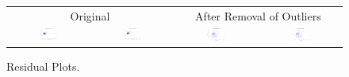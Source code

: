 \documentclass[11pt]{scrartcl} %
\begin{document}
\begin{figure}[H] %
	\centering
	\begin{tabular}{p{} p{}p{}p{}}
	\hline
	\multicolumn{2}{|c|}{Original} &  \multicolumn{2}{|c|}{After Removal of Outliers} \\
		\multicolumn{1}{|c}{\includegraphics[width=0.23\textwidth]{../graphics/A1Residuals1}} &
		\multicolumn{1}{c|}{\includegraphics[width=0.23\textwidth]{../graphics/A1StudentResiduals1}} &
		\multicolumn{1}{|c}{\includegraphics[width=0.23\textwidth]{../graphics/A1Residuals2}} &
		\multicolumn{1}{c|}{\includegraphics[width=0.23\textwidth]{../graphics/A1StudentResiduals2}}\\
		\hline
	\end{tabular}		
	\caption{Residual Plots.} %
	\label{fig:A1RP}
\end{figure}
\end{document}
